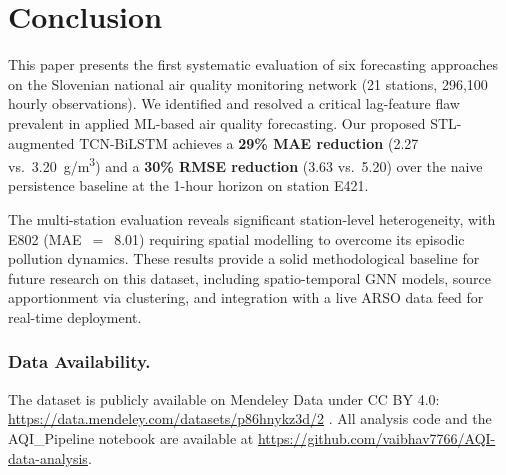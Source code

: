 \documentclass[runningheads]{llncs}
\begin{document}
\section{Conclusion}

This paper presents the first systematic evaluation of six forecasting
approaches on the Slovenian national air quality monitoring network
(21 stations, 296{,}100 hourly observations). We identified and resolved
a critical lag-feature flaw prevalent in applied ML-based air quality
forecasting. Our proposed STL-augmented TCN-BiLSTM achieves a
\textbf{29\% MAE reduction} (2.27 vs.\ 3.20~\textmu{}g/m\textsuperscript{3})
and a \textbf{30\% RMSE reduction} (3.63 vs.\ 5.20) over the naive
persistence baseline at the 1-hour horizon on station E421.

The multi-station evaluation reveals significant station-level
heterogeneity, with E802 (MAE~$=$~8.01) requiring spatial modelling
to overcome its episodic pollution dynamics. These results provide a
solid methodological baseline for future research on this dataset,
including spatio-temporal GNN models, source apportionment via
clustering, and integration with a live ARSO data feed for real-time
deployment.

\subsubsection*{Data Availability.}
The dataset is publicly available on Mendeley Data under CC BY 4.0:
\url{https://data.mendeley.com/datasets/p86hnykz3d/2} \cite{ref_dataset}.
All analysis code and the AQI\_Pipeline notebook are available at
\url{https://github.com/vaibhav7766/AQI-data-analysis}.
\end{document}
